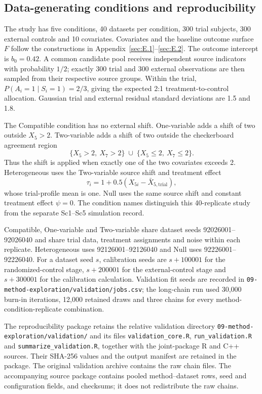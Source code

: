 \subsection{Data-generating conditions and reproducibility}

The study has five conditions, 40 datasets per condition, 300 trial subjects, 300 external controls and 10 covariates. Covariates and the baseline outcome surface $F$ follow the constructions in Appendix~\ref{sec:E.1}--\ref{sec:E.2}. The outcome intercept is $b_0=0.42$. A common candidate pool receives independent source indicators with probability $1/2$; exactly 300 trial and 300 external observations are then sampled from their respective source groups. Within the trial, $P(A_i=1\mid S_i=1)=2/3$, giving the expected 2:1 treatment-to-control allocation. Gaussian trial and external residual standard deviations are 1.5 and 1.8.

The Compatible condition has no external shift. One-variable adds a shift of two outside $X_5>2$. Two-variable adds a shift of two outside the checkerboard agreement region
\[
 \{X_5>2,\ X_7>2\}\;\cup\;\{X_5\leq 2,\ X_7\leq 2\}.
\]
Thus the shift is applied when exactly one of the two covariates exceeds 2. Heterogeneous uses the Two-variable source shift and treatment effect
\[
 \tau_i=1+0.5(X_{5i}-\bar X_{5,\mathrm{trial}}),
\]
whose trial-profile mean is one. Null uses the same source shift and constant treatment effect $\psi=0$. The condition names distinguish this 40-replicate study from the separate Sc1--Sc5 simulation record.

Compatible, One-variable and Two-variable share dataset seeds 92026001--92026040 and share trial data, treatment assignments and noise within each replicate. Heterogeneous uses 92126001--92126040 and Null uses 92226001--92226040. For a dataset seed $s$, calibration seeds are $s+100001$ for the randomized-control stage, $s+200001$ for the external-control stage and $s+300001$ for the calibration calculation. Validation fit seeds are recorded in \texttt{09-method-exploration/}\allowbreak\texttt{validation/jobs.csv}; the long-chain run used 30,000 burn-in iterations, 12,000 retained draws and three chains for every method-condition-replicate combination.

The reproducibility package retains the relative validation directory \texttt{09-method-exploration/}\allowbreak\texttt{validation/} and its files \texttt{validation\_core.R}, \texttt{run\_validation.R} and \texttt{summarize\_validation.R}, together with the joint-package R and C++ sources. Their SHA-256 values and the output manifest are retained in the package. The original validation archive contains the raw chain files. The accompanying source package contains pooled method--dataset rows, seed and configuration fields, and checksums; it does not redistribute the raw chains.

